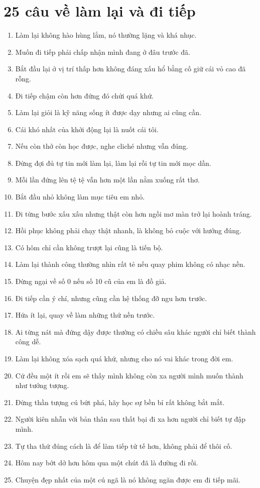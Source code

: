 \section{25 câu về làm lại và đi tiếp}
\begin{enumerate}[leftmargin=*,resume]
\item Làm lại không hào hùng lắm, nó thường lặng và khá nhục.
\item Muốn đi tiếp phải chấp nhận mình đang ở đâu trước đã.
\item Bắt đầu lại ở vị trí thấp hơn không đáng xấu hổ bằng cố giữ cái vỏ cao đã rỗng.
\item Đi tiếp chậm còn hơn đứng đó chửi quá khứ.
\item Làm lại giỏi là kỹ năng sống ít được dạy nhưng ai cũng cần.
\item Cái khó nhất của khởi động lại là nuốt cái tôi.
\item Nếu còn thở còn học được, nghe cliché nhưng vẫn đúng.
\item Đừng đợi đủ tự tin mới làm lại, làm lại rồi tự tin mới mọc dần.
\item Mỗi lần đứng lên tệ tệ vẫn hơn một lần nằm xuống rất thơ.
\item Bắt đầu nhỏ không làm mục tiêu em nhỏ.
\item Đi từng bước xấu xấu nhưng thật còn hơn ngồi mơ màn trở lại hoành tráng.
\item Hồi phục không phải chạy thật nhanh, là không bỏ cuộc với hướng đúng.
\item Có hôm chỉ cần không trượt lại cũng là tiến bộ.
\item Làm lại thành công thường nhìn rất tẻ nếu quay phim không có nhạc nền.
\item Đừng ngại về số 0 nếu số 10 cũ của em là đồ giả.
\item Đi tiếp cần ý chí, nhưng cũng cần hệ thống đỡ ngu hơn trước.
\item Hứa ít lại, quay về làm những thứ nền trước.
\item Ai từng nát mà đứng dậy được thường có chiều sâu khác người chỉ biết thành công dễ.
\item Làm lại không xóa sạch quá khứ, nhưng cho nó vai khác trong đời em.
\item Cứ đều một ít rồi em sẽ thấy mình không còn xa người mình muốn thành như tưởng tượng.
\item Đừng thần tượng cú bứt phá, hãy học sự bền bỉ rất không bắt mắt.
\item Người kiên nhẫn với bản thân sau thất bại đi xa hơn người chỉ biết tự đập mình.
\item Tự tha thứ đúng cách là để làm tiếp tử tế hơn, không phải để thôi cố.
\item Hôm nay bớt dở hơn hôm qua một chút đã là đường đi rồi.
\item Chuyện đẹp nhất của một cú ngã là nó không ngăn được em đi tiếp mãi.
\end{enumerate}


